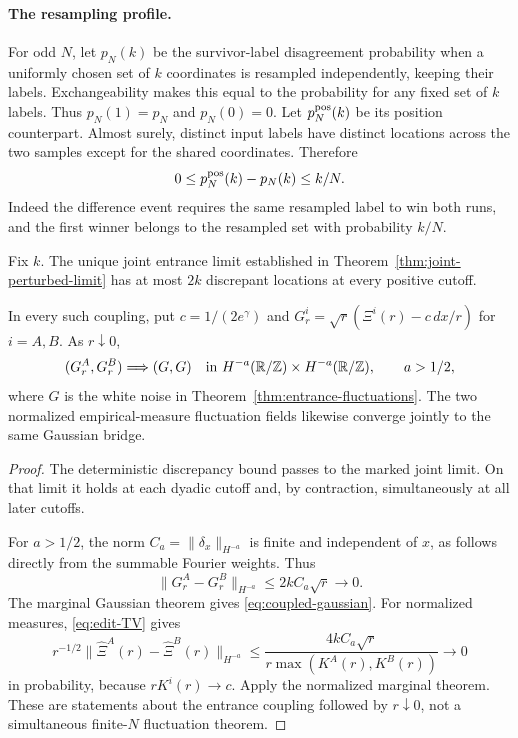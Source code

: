 \documentclass[11pt,letterpaper]{article}
\newcommand{\T}{\mathbb R/\mathbb Z}\newcommand{\Leb}{\operatorname{Leb}}
\begin{document}
\paragraph{The resampling profile.}
For odd $N$, let $p_N(k)$ be the survivor-label disagreement
probability when a uniformly chosen set of $k$ coordinates is
resampled independently, keeping their labels. Exchangeability
makes this equal to the probability for any fixed set of $k$ labels.
Thus $p_N(1)=p_N$ and $p_N(0)=0$. Let $p_N^{\rm pos}(k)$ be its
position counterpart. Almost surely, distinct input labels have
distinct locations across the two samples except for the shared
coordinates. Therefore
\begin{equation}\label{eq:k-label-position}
 0\le p_N^{\rm pos}(k)-p_N(k)\le k/N.
\end{equation}
Indeed the difference event requires the same resampled label to
win both runs, and the first winner belongs to the resampled set
with probability $k/N$.

\begin{proposition}
\label{prop:coupled-entrance}
Fix $k$. The unique joint entrance limit established in
Theorem~\ref{thm:joint-perturbed-limit} has at most $2k$ discrepant
locations at every positive cutoff.

In every such coupling, put $c=1/(2e^\gamma)$ and
$G_r^i=\sqrt r(\Xi^i(r)-c\,dx/r)$ for $i=A,B$. As $r\downarrow0$,
\begin{equation}\label{eq:coupled-gaussian}
 (G_r^A,G_r^B)\Longrightarrow(G,G)
 \quad\hbox{in }H^{-a}(\T)\times H^{-a}(\T),\qquad a>1/2,
\end{equation}
where $G$ is the white noise in Theorem~\ref{thm:entrance-fluctuations}.
The two normalized empirical-measure fluctuation fields likewise
converge jointly to the same Gaussian bridge.
\end{proposition}
\begin{proof}
The deterministic discrepancy bound passes to the marked joint limit.
On that limit it holds at each dyadic cutoff and, by contraction,
simultaneously at all later cutoffs.

For $a>1/2$, the norm $C_a=\|\delta_x\|_{H^{-a}}$ is finite and
independent of $x$, as follows directly from the summable Fourier
weights. Thus
\[
 \|G_r^A-G_r^B\|_{H^{-a}}\le2kC_a\sqrt r\longrightarrow0.
\]
The marginal Gaussian theorem gives \eqref{eq:coupled-gaussian}.
For normalized measures, \eqref{eq:edit-TV} gives
\[
 r^{-1/2}\|\widehat\Xi^A(r)-\widehat\Xi^B(r)\|_{H^{-a}}
 \le\frac{4kC_a\sqrt r}{r\max(K^A(r),K^B(r))}
 \longrightarrow0
\]
in probability, because $rK^i(r)\to c$. Apply the normalized
marginal theorem. These are statements about the entrance coupling
followed by $r\downarrow0$, not a simultaneous
finite-$N$ fluctuation theorem.
\end{proof}
\end{document}
